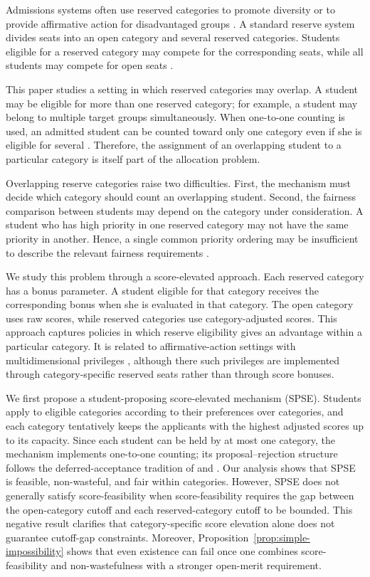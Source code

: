 \documentclass[10pt]{article}
\newcommand{\1}{\mathbf{1}}
\begin{document}
Admissions systems often use reserved categories to promote diversity or to provide affirmative action for disadvantaged groups \citep{Abdu05a,AyTu20a,AyBo21a}. A standard reserve system divides seats into an open category and several reserved categories. Students eligible for a reserved category may compete for the corresponding seats, while all students may compete for open seats \citep{Abdu05a,AyTu23a}.

This paper studies a setting in which reserved categories may overlap. A student may be eligible for more than one reserved category; for example, a student may belong to multiple target groups simultaneously. When one-to-one counting is used, an admitted student can be counted toward only one category even if she is eligible for several \citep{AyBo21a,KHIY17a}. Therefore, the assignment of an overlapping student to a particular category is itself part of the allocation problem.

Overlapping reserve categories raise two difficulties. First, the mechanism must decide which category should count an overlapping student. Second, the fairness comparison between students may depend on the category under consideration. A student who has high priority in one reserved category may not have the same priority in another. Hence, a single common priority ordering may be insufficient to describe the relevant fairness requirements \citep{KHIY17a,GKK+17a}.

We study this problem through a score-elevated approach. Each reserved category has a bonus parameter. A student eligible for that category receives the corresponding bonus when she is evaluated in that category. The open category uses raw scores, while reserved categories use category-adjusted scores. This approach captures policies in which reserve eligibility gives an advantage within a particular category. It is related to affirmative-action settings with multidimensional privileges \citep{AyBo21a}, although there such privileges are implemented through category-specific reserved seats rather than through score bonuses.

We first propose a student-proposing score-elevated mechanism (SPSE). Students apply to eligible categories according to their preferences over categories, and each category tentatively keeps the applicants with the highest adjusted scores up to its capacity. Since each student can be held by at most one category, the mechanism implements one-to-one counting; its proposal--rejection structure follows the deferred-acceptance tradition of \citet{GaSh62a} and \citet{Roth08a}. Our analysis shows that SPSE is feasible, non-wasteful, and fair within categories. However, SPSE does not generally satisfy score-feasibility when score-feasibility requires the gap between the open-category cutoff and each reserved-category cutoff to be bounded. This negative result clarifies that category-specific score elevation alone does not guarantee cutoff-gap constraints. Moreover, Proposition~\ref{prop:simple-impossibility} shows that even existence can fail once one combines score-feasibility and non-wastefulness with a stronger open-merit requirement.
\end{document}
